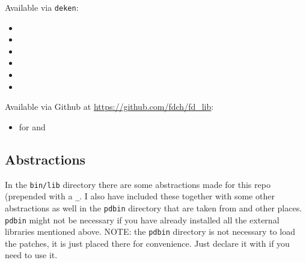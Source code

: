 Available via \texttt{deken}:

\begin{itemize}
  \singlespacing
\tightlist
\item
\item
\item
\item
\item
\item
\end{itemize}

Available via Github at \url{https://github.com/fdch/fd_lib}:

\begin{itemize}
  \singlespacing
\tightlist
\item
   for  and 
\end{itemize}


\subsection*{Abstractions}

In the \texttt{bin/lib} directory there are some abstractions made for this repo (prepended with a \texttt{\_}. I also have included these together with some other abstractions as well in the \texttt{pdbin} directory that are taken from  and other places. \texttt{pdbin} might not be necessary if you have already installed all the external libraries mentioned above. NOTE: the \texttt{pdbin} directory is not necessary to load the patches, it is just placed there for convenience. Just declare it with  if you need to use it.

